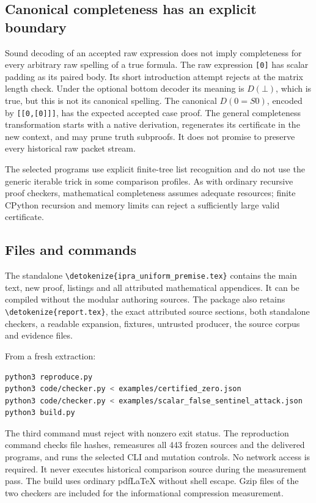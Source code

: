 \documentclass[11pt,letterpaper]{article}
\theoremstyle{definition}\newtheorem{definition}[theorem]{Definition}
\theoremstyle{remark}\newtheorem{remark}[theorem]{Remark}
\newcommand{\file}[1]{\expandafter\nolinkurl\expandafter{\detokenize{#1}}}
\begin{document}
\subsection{Canonical completeness has an explicit boundary}

Sound decoding of an accepted raw expression does not imply completeness
for every arbitrary raw spelling of a true formula. The raw expression
\texttt{[0]} has scalar padding as its paired body. Its short introduction
attempt rejects at the matrix length check. Under the optional bottom
decoder its meaning is \(D(\bot)\), which is true, but this is not its
canonical spelling. The canonical \(D(0=S0)\), encoded by
\texttt{[[0,[0]]]}, has the expected accepted case proof. The general
completeness transformation starts with a native derivation, regenerates
its certificate in the new context, and may prune truth subproofs. It
does not promise to preserve every historical raw packet stream.

The selected programs use explicit finite-tree list recognition and do
not use the generic iterable trick in some comparison profiles. As with
ordinary recursive proof checkers, mathematical completeness assumes
adequate resources; finite CPython recursion and memory limits can reject
a sufficiently large valid certificate.

\subsection{Files and commands}

The standalone \file{ipra_uniform_premise.tex} contains the main text,
new proof, listings and all attributed mathematical appendices. It can
be compiled without the modular authoring sources. The package also
retains \file{report.tex}, the exact attributed source sections, both
standalone checkers, a readable expansion, fixtures, untrusted producer,
the source corpus and evidence files.

From a fresh extraction:
\begin{lstlisting}[language=bash]
python3 reproduce.py
python3 code/checker.py < examples/certified_zero.json
python3 code/checker.py < examples/scalar_false_sentinel_attack.json
python3 build.py
\end{lstlisting}
The third command must reject with nonzero exit status. The reproduction
command checks file hashes, remeasures all 443 frozen sources and the
delivered programs, and runs the selected CLI and mutation controls.
No network access is required. It never executes historical comparison
source during the measurement pass. The build uses ordinary pdfLaTeX
without shell escape. Gzip files of the two checkers are included for
the informational compression measurement.
\end{document}
